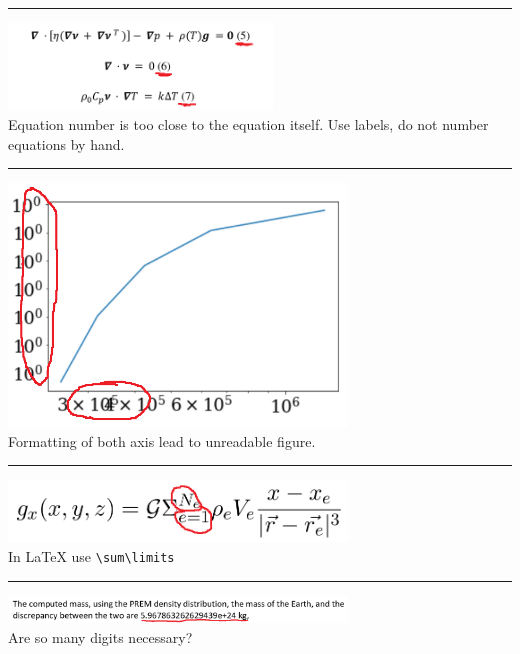 \par\noindent\rule{\textwidth}{0.4pt}
\begin{center}
\includegraphics[width=7cm]{images/grading/eqs3}\\
Equation number is too close to the equation itself. Use labels, 
do not number equations by hand.
\end{center}

\par\noindent\rule{\textwidth}{0.4pt}
\begin{center}
\includegraphics[width=9cm]{images/grading/eqs4}\\
Formatting of both axis lead to unreadable figure.
\end{center}

\par\noindent\rule{\textwidth}{0.4pt}
\begin{center}
\includegraphics[width=9cm]{images/grading/eqs5}\\
In \LaTeX{}  use \verb!\sum\limits!
\end{center}

\par\noindent\rule{\textwidth}{0.4pt}
\begin{center}
\includegraphics[width=9cm]{images/grading/eqs6}\\
Are so many digits necessary?
\end{center}


